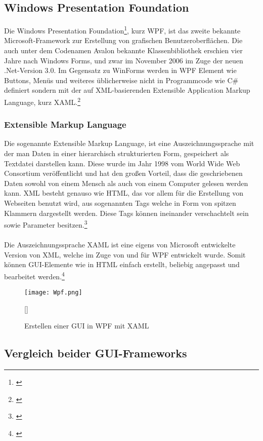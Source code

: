 \subsection{Windows Presentation Foundation}
Die Windows Presentation Foundation\footnote[3]{\cite[Vgl.][]{WPF1}}, kurz WPF, ist das zweite bekannte Microsoft-Framework zur Erstellung von grafischen Benutzeroberflächen. Die auch unter dem Codenamen Avalon bekannte Klassenbibliothek erschien vier Jahre nach Windows Forms, und zwar im November 2006 im Zuge der neuen .Net-Version 3.0. Im Gegensatz zu WinForms werden in WPF Element wie Buttons, Menüs und weiteres üblicherweise nicht in Programmcode wie C\# definiert sondern mit der auf XML-basierenden Extensible Application Markup Language, kurz XAML.\footnote[4]{\cite[Vgl.][]{WPF2}}

\subsubsection{Extensible Markup Language}
Die sogenannte Extensible Markup Language, ist eine Auszeichnungssprache mit der man Daten in einer hierarchisch strukturierten Form, gespeichert als Textdatei darstellen kann. Diese wurde im Jahr 1998 vom World Wide Web Consortium veröffentlicht und hat den großen Vorteil, dass die geschriebenen Daten sowohl von einem Mensch als auch von einem Computer gelesen werden kann. XML besteht genauso wie HTML, das vor allem für die Erstellung von Webseiten benutzt wird, aus sogenannten Tags welche in Form von spitzen Klammern dargestellt werden. Diese Tags können ineinander verschachtelt sein sowie Parameter besitzen.\footnote[1]{\cite[Vgl.][]{XML}}
\\ \ \\
Die Auszeichnungssprache XAML ist eine eigens von Microsoft entwickelte Version von XML, welche im Zuge von und für WPF entwickelt wurde. Somit können GUI-Elemente wie in HTML einfach erstellt, beliebig angepasst und bearbeitet werden.\footnote[2]{\cite[Vgl.][]{XAML1}}
\\
\begin{figure}[H]
    \centering
    \texttt{[image: Wpf.png]}
    \caption[XAML-Code]{Erstellen einer GUI in WPF mit XAML}[\cite{XAML2}]
\end{figure}

\subsection{Vergleich beider GUI-Frameworks}

